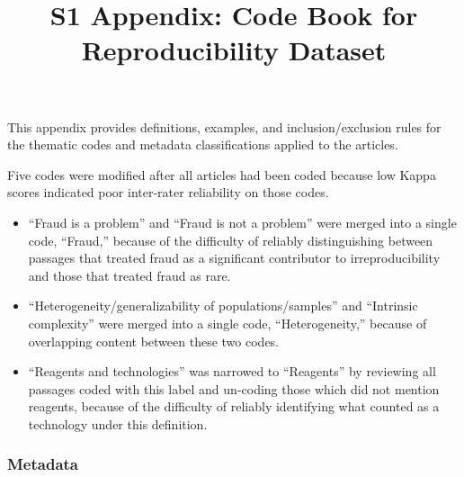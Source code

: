\documentclass[
]{scrartcl}
\title{S1 Appendix: Code Book for Reproducibility Dataset}
\author{}
\date{\vspace{-2.5em}}
\begin{document}
\maketitle

This appendix provides definitions, examples, and inclusion/exclusion
rules for the thematic codes and metadata classifications applied to the
articles.

Five codes were modified after all articles had been coded because low
Kappa scores indicated poor inter-rater reliability on those codes.

\begin{itemize}
\item
  ``Fraud is a problem'' and ``Fraud is not a problem'' were merged into
  a single code, ``Fraud,'' because of the difficulty of reliably
  distinguishing between passages that treated fraud as a significant
  contributor to irreproducibility and those that treated fraud as rare.
\item
  ``Heterogeneity/generalizability of populations/samples'' and
  ``Intrinsic complexity'' were merged into a single code,
  ``Heterogeneity,'' because of overlapping content between these two
  codes.
\item
  ``Reagents and technologies'' was narrowed to ``Reagents'' by
  reviewing all passages coded with this label and un-coding those which
  did not mention reagents, because of the difficulty of reliably
  identifying what counted as a technology under this definition.
\end{itemize}

\hypertarget{metadata}{%
\subsubsection{Metadata}\label{metadata}}
\end{document}
